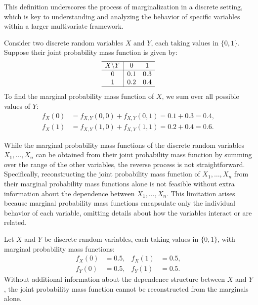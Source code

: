 This definition underscores the process of marginalization in a discrete setting, which is key to understanding and analyzing the behavior of specific variables within a larger multivariate framework.

\begin{example}
Consider two discrete random variables $X$ and $Y$, each taking values in $\{0, 1\}$. Suppose their joint probability mass function is given by:
\[
\begin{array}{c|cc}
\hline
X \backslash Y & 0 & 1 \\
\hline
0 & 0.1 & 0.3 \\
1 & 0.2 & 0.4 \\
\hline
\end{array}
\]
To find the marginal probability mass function of $X$, we sum over all possible values of $Y$:
\[
\begin{aligned}
f_{X}(0) &= f_{X,Y}(0,0) + f_{X,Y}(0,1) = 0.1 + 0.3 = 0.4, \\
f_{X}(1) &= f_{X,Y}(1,0) + f_{X,Y}(1,1) = 0.2 + 0.4 = 0.6.
\end{aligned}
\]
\end{example}

While the marginal probability mass functions of the discrete random variables $X_{1}, \ldots, X_{n}$ can be obtained from their joint probability mass function by summing over the range of the other variables, the reverse process is not straightforward. Specifically, reconstructing the joint probability mass function of $X_{1}, \ldots, X_{n}$ from their marginal probability mass functions alone is not feasible without extra information about the dependence between $X_{1}, \ldots, X_{n}$. This limitation arises because marginal probability mass functions encapsulate only the individual behavior of each variable, omitting details about how the variables interact or are related.

\begin{example}
Let $X$ and $Y$ be discrete random variables, each taking values in $\{0, 1\}$, with marginal probability mass functions:
\[
\begin{aligned}
f_{X}(0) &= 0.5, & f_{X}(1) &= 0.5, \\
f_{Y}(0) &= 0.5, & f_{Y}(1) &= 0.5.
\end{aligned}
\]
Without additional information about the dependence structure between $X$ and $Y$, the joint probability mass function cannot be reconstructed from the marginals alone.
\end{example}

